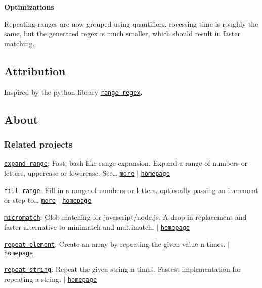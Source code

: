{\bfseries Optimizations}

Repeating ranges are now grouped using quantifiers. rocessing time is roughly the same, but the generated regex is much smaller, which should result in faster matching.

\subsection*{Attribution}

Inspired by the python library \href{https://github.com/dimka665/range-regex}{\tt range-\/regex}.

\subsection*{About}

\subsubsection*{Related projects}


\begin{DoxyItemize}
\item \href{https://www.npmjs.com/package/expand-range}{\tt expand-\/range}\+: Fast, bash-\/like range expansion. Expand a range of numbers or letters, uppercase or lowercase. See… \href{https://github.com/jonschlinkert/expand-range}{\tt more} $\vert$ \href{https://github.com/jonschlinkert/expand-range}{\tt homepage}
\item \href{https://www.npmjs.com/package/fill-range}{\tt fill-\/range}\+: Fill in a range of numbers or letters, optionally passing an increment or {\ttfamily step} to… \href{https://github.com/jonschlinkert/fill-range}{\tt more} $\vert$ \href{https://github.com/jonschlinkert/fill-range}{\tt homepage}
\item \href{https://www.npmjs.com/package/micromatch}{\tt micromatch}\+: Glob matching for javascript/node.\+js. A drop-\/in replacement and faster alternative to minimatch and multimatch. $\vert$ \href{https://github.com/jonschlinkert/micromatch}{\tt homepage}
\item \href{https://www.npmjs.com/package/repeat-element}{\tt repeat-\/element}\+: Create an array by repeating the given value n times. $\vert$ \href{https://github.com/jonschlinkert/repeat-element}{\tt homepage}
\item \href{https://www.npmjs.com/package/repeat-string}{\tt repeat-\/string}\+: Repeat the given string n times. Fastest implementation for repeating a string. $\vert$ \href{https://github.com/jonschlinkert/repeat-string}{\tt homepage}
\end{DoxyItemize}


